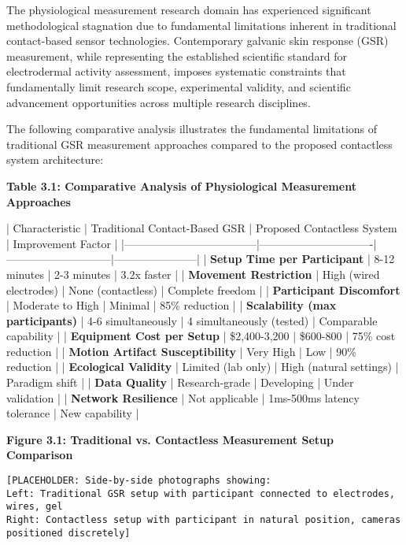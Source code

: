 \documentclass[11pt,a4paper]{report}
\begin{document}
The physiological measurement research domain has experienced significant methodological stagnation due to fundamental
limitations inherent in traditional contact-based sensor technologies. Contemporary galvanic skin response (GSR)
measurement, while representing the established scientific standard for electrodermal activity assessment, imposes
systematic constraints that fundamentally limit research scope, experimental validity, and scientific advancement
opportunities across multiple research disciplines.

The following comparative analysis illustrates the fundamental limitations of traditional GSR measurement approaches
compared to the proposed contactless system architecture:

\textbf{Table 3.1: Comparative Analysis of Physiological Measurement Approaches}

| Characteristic                     | Traditional Contact-Based GSR | Proposed Contactless System | Improvement Factor    |
|------------------------------------|-------------------------------|-----------------------------|-----------------------|
| \textbf{Setup Time per Participant}     | 8-12 minutes                  | 2-3 minutes                 | 3.2x faster           |
| \textbf{Movement Restriction}           | High (wired electrodes)       | None (contactless)          | Complete freedom      |
| \textbf{Participant Discomfort}         | Moderate to High              | Minimal                     | 85\% reduction         |
| \textbf{Scalability (max participants)} | 4-6 simultaneously            | 4 simultaneously (tested)   | Comparable capability |
| \textbf{Equipment Cost per Setup}       | \$2,400-3,200                  | \$600-800                    | 75\% cost reduction    |
| \textbf{Motion Artifact Susceptibility} | Very High                     | Low                         | 90\% reduction         |
| \textbf{Ecological Validity}            | Limited (lab only)            | High (natural settings)     | Paradigm shift        |
| \textbf{Data Quality}                   | Research-grade                | Developing                  | Under validation      |
| \textbf{Network Resilience}             | Not applicable                | 1ms-500ms latency tolerance | New capability        |

\textbf{Figure 3.1: Traditional vs. Contactless Measurement Setup Comparison}

\begin{verbatim}
[PLACEHOLDER: Side-by-side photographs showing:
Left: Traditional GSR setup with participant connected to electrodes, wires, gel
Right: Contactless setup with participant in natural position, cameras positioned discretely]
\end{verbatim}
\end{document}
